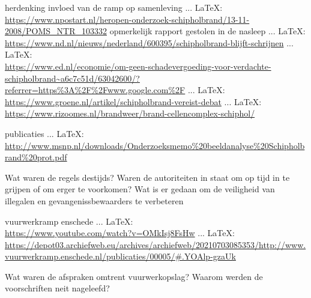 \begin{thebibliography}{99}
{{{{{{{							herdenking
							invloed van de ramp op samenleving
							 ... \LaTeX:\\ \url{https://www.npostart.nl/heropen-onderzoek-schipholbrand/13-11-2008/POMS_NTR_103332}
							opmerkelijk rapport gestolen in de nasleep
							 ... \LaTeX:\\ \url{https://www.nd.nl/nieuws/nederland/600395/schipholbrand-blijft-schrijnen}
							 ... \LaTeX:\\ \url{https://www.ed.nl/economie/om-geen-schadevergoeding-voor-verdachte-schipholbrand~a6c7c51d/63042600/?referrer=https%3A%2F%2Fwww.google.com%2F}
							 ... \LaTeX:\\ \url{https://www.groene.nl/artikel/schipholbrand-vereist-debat}
							 ... \LaTeX:\\ \url{https://www.rizoomes.nl/brandweer/brand-cellencomplex-schiphol/}
							
							
							
							publicaties
							 ... \LaTeX:\\ \url{http://www.msnp.nl/downloads/Onderzoeksmemo%20beeldanalyse%20Schipholbrand%20prot.pdf}
							
							Wat waren de regels destijds?
							Waren de autoriteiten in staat om op tijd in te grijpen of om erger te voorkomen?
							Wat is er gedaan om de veiligheid van illegalen en gevangenissbewaarders te verbeteren
							
							
							
							vuurwerkramp enschede
							 ... \LaTeX:\\ \url{https://www.youtube.com/watch?v=OMkIsj8FsHw}
							 ... \LaTeX:\\ \url{https://depot03.archiefweb.eu/archives/archiefweb/20210703085353/http://www.vuurwerkramp.enschede.nl/publicaties/00005/#.YOAlp-gzaUk}
							
							Wat waren de afspraken omtrent vuurwerkopslag?
							Waarom werden de voorschriften neit nageleefd?
							
							
							
}}}}}}}
\end{thebibliography}

